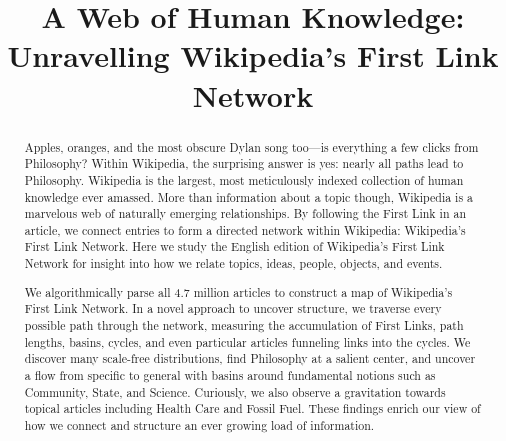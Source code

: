 \documentclass[pre,twocolumn,twoside,superscriptaddress,floatfix, aps, 10pt]{revtex4-1}
\begin{document}
\title{\protect
A Web of Human Knowledge: 
Unravelling Wikipedia's First Link Network
}

\author{
}


\author{
}



\author{
}



\begin{abstract}
  \protect
Apples, oranges, and the most obscure Dylan song too---is everything a few clicks from Philosophy? 
Within Wikipedia, the surprising answer is yes: nearly all 
paths lead to Philosophy.
Wikipedia is the largest, most meticulously indexed collection of human knowledge ever amassed. 
More than information about a topic though, Wikipedia is a marvelous web of naturally emerging relationships.  
By following the First Link in an article, we connect entries to form a directed network within Wikipedia: Wikipedia's First Link Network. 
Here we study the English edition of Wikipedia's First Link Network for insight into how we relate topics, ideas, people, objects, and events.  


We algorithmically parse all 4.7 million articles to construct a map of Wikipedia's First Link Network. 
In a novel approach to uncover structure, we traverse every possible path through the network, 
measuring the accumulation of First Links, path lengths, basins, cycles, and even particular articles funneling links into the cycles.
We discover many scale-free distributions, find Philosophy at a salient center, and uncover a flow from specific to general with 
basins around fundamental notions such as Community, State, and Science. 
Curiously, we also observe a gravitation towards topical articles including Health Care and Fossil Fuel.
These findings enrich our view of how we connect and structure
an ever growing load of information.
 
\end{abstract}
\end{document}
